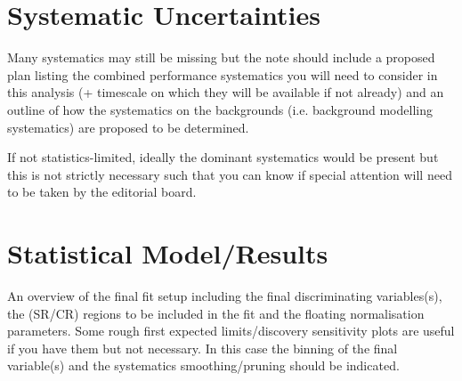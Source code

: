 \documentclass[NOTE, atlasdraft=true, texlive=2016, USenglish]{\ATLASLATEXPATH atlasdoc}
\begin{document}
\section{Systematic Uncertainties}

Many systematics may still be missing but the note should include a proposed plan
listing the combined performance systematics you will need to consider in this analysis 
(+ timescale on which they will be available if not already) and an outline of how the 
systematics on the backgrounds (i.e. background modelling systematics) are proposed to be determined.

If not statistics-limited, ideally the dominant systematics would be present but this is not
strictly necessary such that you can know if special attention will need to be taken by the
editorial board.

\section{Statistical Model/Results}

An overview of the final fit setup including the final discriminating variables(s),
the (SR/CR) regions to be included in the fit and the floating normalisation parameters.
Some rough first  expected limits/discovery sensitivity plots are useful if you have them but
not necessary. In this case the binning of the final variable(s) and the systematics
smoothing/pruning should be indicated.
\end{document}
